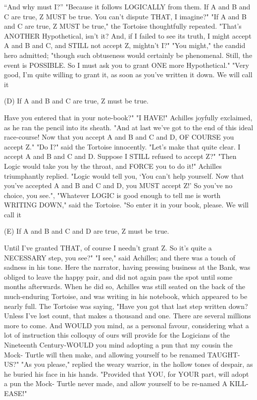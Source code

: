    “And why must I?”
   "Because it follows LOGICALLY from them. If A and B and C are true, Z MUST be
true. You can't dispute THAT, I imagine?"
   "If A and B and C are true, Z MUST be true," the Tortoise thoughtfully repeated.
"That's ANOTHER Hypothetical, isn't it? And, if I failed to see its truth, I might accept A
and B and C, and STILL not accept Z, mightn't I?"
   "You might," the candid hero admitted; "though such obtuseness would certainly be
phenomenal. Still, the event is POSSIBLE. So I must ask you to grant ONE more
Hypothetical."
   "Very good, I'm quite willing to grant it, as soon as you've written it down. We will
call it

   (D) If A and B and C are true, Z must be true.

Have you entered that in your note-book?"
    "I HAVE!" Achilles joyfully exclaimed, as he ran the pencil into its sheath. "And at
last we've got to the end of this ideal race-course! Now that you accept A and B and C
and D, OF COURSE you accept Z."
    "Do I?" said the Tortoise innocently. "Let's make that quite clear. I accept A and B and
C and D. Suppose I STILL refused to accept Z?"
    "Then Logic would take you by the throat, and FORCE you to do it!" Achilles
triumphantly replied. "Logic would tell you, `You can't help yourself. Now that you've
accepted A and B and C and D, you MUST accept Z!' So you've no choice, you see.",
    "Whatever LOGIC is good enough to tell me is worth WRITING DOWN," said the
Tortoise. "So enter it in your book, please. We will call it

       (E) If A and B and C and D are true, Z must be true.

   Until I've granted THAT, of course I needn't grant Z. So it's quite a NECESSARY
step, you see?"
   "I see," said Achilles; and there was a touch of sadness in his tone.
   Here the narrator, having pressing business at the Bank, was obliged to leave the
happy pair, and did not again pass the spot until some months afterwards. When he did
so, Achilles was still seated on the back of the much-enduring Tortoise, and was writing
in his notebook, which appeared to be nearly full. The Tortoise was saying, "Have you
got that last step written down? Unless I've lost count, that makes a thousand and one.
There are several millions more to come. And WOULD you mind, as a personal favour,
considering what a lot of instruction this colloquy of ours will provide for the Logicians
of the Nineteenth Century-WOULD you mind adopting a pun that my cousin the Mock-
Turtle will then make, and allowing yourself to be renamed TAUGHT-US?"
   "As you please," replied the weary warrior, in the hollow tones of despair, as he buried
his face in his hands. "Provided that YOU, for YOUR part, will adopt a pun the Mock-
Turtle never made, and allow yourself to be re-named A KILL-EASE!"




